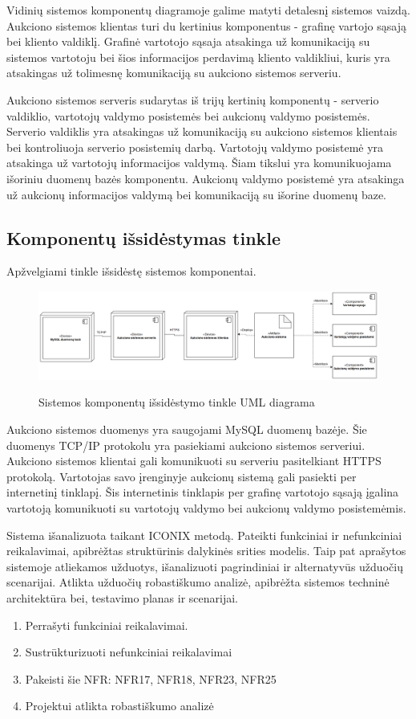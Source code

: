 \documentclass{VUMIFPSkursinis}
\begin{document}
	Vidinių sistemos komponentų diagramoje galime matyti detalesnį sistemos vaizdą. Aukciono sistemos klientas turi du kertinius komponentus - grafinę vartojo sąsają bei kliento valdiklį. Grafinė vartotojo sąsaja atsakinga už komunikaciją su sistemos vartotoju bei šios informacijos perdavimą kliento valdikliui, kuris yra atsakingas už tolimesnę komunikaciją su aukciono sistemos serveriu.

	Aukciono sistemos serveris sudarytas iš trijų kertinių komponentų - serverio valdiklio, vartotojų valdymo posistemės bei aukcionų valdymo posistemės. Serverio valdiklis yra atsakingas už komunikaciją su aukciono sistemos klientais bei kontroliuoja serverio posistemių darbą. Vartotojų valdymo posistemė yra atsakinga už vartotojų informacijos valdymą. Šiam tikslui yra komunikuojama išoriniu duomenų bazės komponentu. Aukcionų valdymo posistemė yra atsakinga už aukcionų informacijos valdymą bei komunikaciją su išorine duomenų baze.

	\newpage

	\subsection{Komponentų išsidėstymas tinkle}
	Apžvelgiami tinkle išsidėstę sistemos komponentai.
	\begin{figure}[H]
		\centering
		\includegraphics[width=\linewidth]{img/umlNetworkComponentDiagram.png}
		\label{fig:aukckoreg}
		\caption{Sistemos komponentų išsidėstymo tinkle UML diagrama}
	\end{figure}

	Aukciono sistemos duomenys yra saugojami MySQL duomenų bazėje. Šie duomenys TCP/IP protokolu yra pasiekiami aukciono sistemos serveriui. Aukciono sistemos klientai gali komunikuoti su serveriu pasitelkiant HTTPS protokolą. Vartotojas savo įrenginyje aukcionų sistemą gali pasiekti per internetinį tinklapį. Šis internetinis tinklapis per grafinę vartotojo sąsają įgalina vartotoją komunikuoti su vartotojų valdymo bei aukcionų valdymo posistemėmis.

	\newpage

	Sistema išanalizuota taikant ICONIX metodą. Pateikti funkciniai ir nefunkciniai reikalavimai, apibrėžtas struktūrinis dalykinės srities modelis. Taip pat aprašytos sistemoje atliekamos užduotys, išanalizuoti pagrindiniai ir alternatyvūs užduočių scenarijai. Atlikta užduočių robastiškumo analizė, apibrėžta sistemos techninė architektūra bei, testavimo planas ir scenarijai.
	\newpage

		\begin{enumerate}
		\item Perrašyti funkciniai reikalavimai.
		\item Sustrūkturizuoti nefunkciniai reikalavimai
		\item  Pakeisti šie NFR: NFR17, NFR18, NFR23, NFR25
		\item Projektui atlikta robastiškumo analizė
	\end{enumerate}
\end{document}
